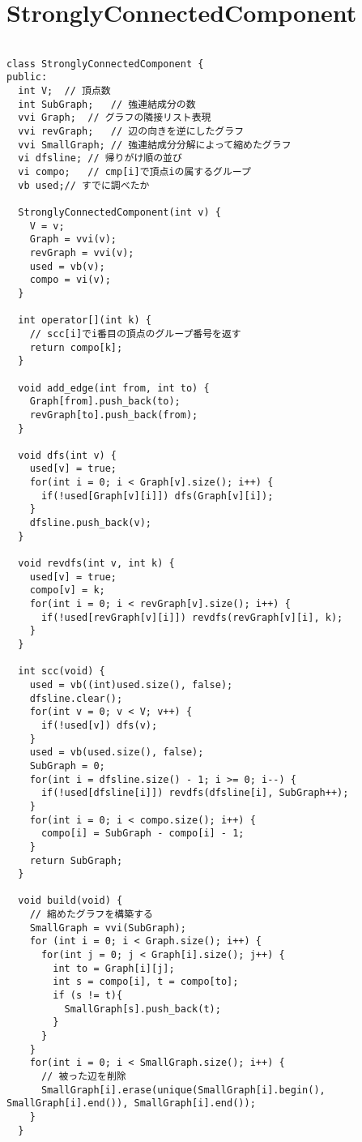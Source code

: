 \documentclass[a4j,titlepage]{jarticle} %
\begin{document}
\color{white}
\section{StronglyConnectedComponent}
\color{black}
\begin{lstlisting}[caption=StronglyConnectedComponent]

class StronglyConnectedComponent {
public:
  int V;  // 頂点数
  int SubGraph;   // 強連結成分の数
  vvi Graph;  // グラフの隣接リスト表現
  vvi revGraph;   // 辺の向きを逆にしたグラフ
  vvi SmallGraph; // 強連結成分分解によって縮めたグラフ
  vi dfsline; // 帰りがけ順の並び
  vi compo;   // cmp[i]で頂点iの属するグループ
  vb used;// すでに調べたか

  StronglyConnectedComponent(int v) {
    V = v;
    Graph = vvi(v);
    revGraph = vvi(v);
    used = vb(v);
    compo = vi(v);
  }

  int operator[](int k) {
    // scc[i]でi番目の頂点のグループ番号を返す
    return compo[k];
  }

  void add_edge(int from, int to) {
    Graph[from].push_back(to);
    revGraph[to].push_back(from);
  }

  void dfs(int v) {
    used[v] = true;
    for(int i = 0; i < Graph[v].size(); i++) {
      if(!used[Graph[v][i]]) dfs(Graph[v][i]);
    }
    dfsline.push_back(v);
  }

  void revdfs(int v, int k) {
    used[v] = true;
    compo[v] = k;
    for(int i = 0; i < revGraph[v].size(); i++) {
      if(!used[revGraph[v][i]]) revdfs(revGraph[v][i], k);
    }
  }

  int scc(void) {
    used = vb((int)used.size(), false);
    dfsline.clear();
    for(int v = 0; v < V; v++) {
      if(!used[v]) dfs(v);
    }
    used = vb(used.size(), false);
    SubGraph = 0;
    for(int i = dfsline.size() - 1; i >= 0; i--) {
      if(!used[dfsline[i]]) revdfs(dfsline[i], SubGraph++);
    }
    for(int i = 0; i < compo.size(); i++) {
      compo[i] = SubGraph - compo[i] - 1;
    }
    return SubGraph;
  }

  void build(void) {
    // 縮めたグラフを構築する
    SmallGraph = vvi(SubGraph);
    for (int i = 0; i < Graph.size(); i++) {
      for(int j = 0; j < Graph[i].size(); j++) {
        int to = Graph[i][j];
        int s = compo[i], t = compo[to];
        if (s != t){
          SmallGraph[s].push_back(t);
        }
      }
    }
    for(int i = 0; i < SmallGraph.size(); i++) {
      // 被った辺を削除
      SmallGraph[i].erase(unique(SmallGraph[i].begin(), SmallGraph[i].end()), SmallGraph[i].end());
    }
  }


\end{lstlisting}
\end{document}
